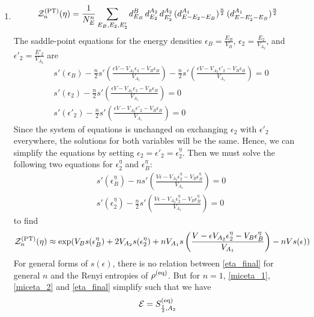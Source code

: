\documentclass[a4paper,11pt]{article}
\newcommand{\be}{\begin{equation}}
\newcommand{\ee}{\end{equation}}
\newcommand\sE{{\ensuremath{{\mathcal E}}}}
\newcommand\sZ{{\mathcal Z}}
\begin{document}
\begin{enumerate}
\begin{appendix}
\begin{enumerate}
 \item 
 \be 
 \begin{gathered}
 \sZ_n^{\rm (PT)}(\eta) = \frac{1}{N_E^n} \sum_{E_{B}, E_{2}, E'_{2}} d^B_{E_B} \, d^{A_2}_{E_{2}} \, d^{A_2}_{E'_2} \, (d^{A_1}_{E-E_{2}-E_B})^{\frac{n}{2}} \, (d^{A_1}_{E-E'_{2}-E_B})^{\frac{n}{2}}\\
 \end{gathered} 
 \ee
 The saddle-point equations for the energy densities $\epsilon_B = \frac{E_B}{V_B}$, $\epsilon_2= \frac{E_2}{V_{A_2}}$, and $\epsilon'_2= \frac{E'_2}{V_{A_2}}$ are 
 \begin{align} 
& s'(\epsilon_B) - \frac{n}{2} s'\left(\frac{\epsilon V - V_{A_2} \epsilon_{2}- V_B \epsilon_B}{V_{A_1}} \right) - \frac{n}{2} s'\left(\frac{\epsilon V - V_{A_2} \epsilon'_2- V_B \epsilon_B}{V_{A_1}} \right) = 0 \\
& s'(\epsilon_2) - \frac{n}{2} s'\left(\frac{\epsilon V - V_{A_2}\epsilon_{2}- V_B\epsilon_B}{V_{A_1}} \right)= 0 \label{e2_fullmic}\\
& s'(\epsilon'_{2}) - \frac{n}{2} s'\left(\frac{\epsilon V - V_{A_2}\epsilon'_{2}- V_B \epsilon_B}{V_{A_1}} \right)= 0 \label{e2p_fullmic}
 \end{align} 
 Since the system of equations is unchanged on exchanging $\epsilon_2$ with $\epsilon'_2$ everywhere, the solutions for both variables will be the same. Hence, we can simplify the equations by setting $\epsilon_2 = \epsilon'_2 = \epsilon_2^{\eta}$. Then we must solve the following two equations for $\epsilon_2^{\eta}$ and $\epsilon_B^{\eta}$: 
 \begin{align} 
 &s'(\epsilon_B^{\eta}) - n s'\left(\frac{V \epsilon - V_{A_2} \epsilon_{2}^{\eta}- V_B\epsilon_B^{\eta}}{V_{A_1}} \right) = 0 \label{miceta_1} \\
&s'(\epsilon_{2}^{\eta}) - \frac{n}{2} s'\left(\frac{V \epsilon - V_{A_2} \epsilon_{2}^{\eta}- V_B\epsilon_B^{\eta}}{V_{A_1}} \right) = 0 \label{miceta_2}
\end{align} 
to find 
 \be 
 \sZ_n^{\rm (PT)}(\eta) \approx \exp(V_B s(\epsilon_B^{\eta}) + 2 V_{A_2} s(\epsilon_2^{\eta}) + n V_{A_1} s\left(\frac{V - \epsilon V_{A_2}\epsilon_2^{\eta} -V_B\epsilon_B^{\eta}}{V_{A_1}} \right)- n V s(\epsilon)) \label{eta_final}
 \ee
For general forms of $s(\epsilon)$, there is no relation between \eqref{eta_final} for general $n$ and the Renyi entropies of $\rho^{\rm (eq)}$. But for $n=1$, \eqref{miceta_1}, \eqref{miceta_2} and \eqref{eta_final} simplify such that we have 
\be
\sE = S^{\rm (eq)}_{\frac{1}{2}, A_2} 
\ee



\end{enumerate}
\end{appendix}
\end{enumerate}
\end{document}
